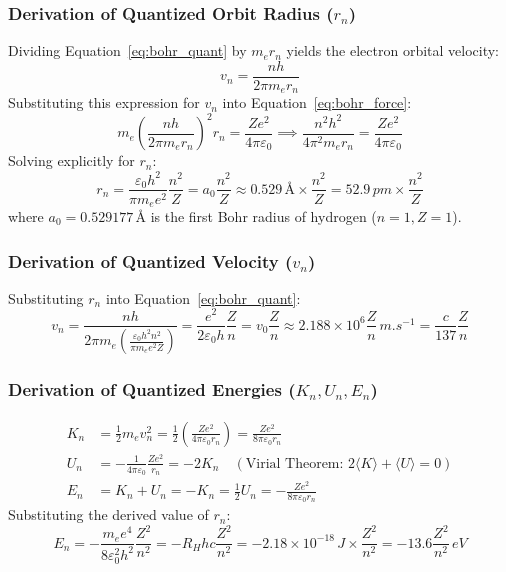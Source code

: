 \documentclass[10pt,a4paper]{article}
\begin{document}
\subsubsection{Derivation of Quantized Orbit Radius ($r_n$)}
Dividing Equation~\ref{eq:bohr_quant} by $m_e r_n$ yields the electron orbital velocity:
\begin{equation}
  v_n = \frac{n h}{2\pi m_e r_n}
\end{equation}
Substituting this expression for $v_n$ into Equation~\ref{eq:bohr_force}:
\begin{equation}
  m_e \left(\frac{n h}{2\pi m_e r_n}\right)^2 r_n = \frac{Z e^2}{4\pi\varepsilon_0} \implies \frac{n^2 h^2}{4\pi^2 m_e r_n} = \frac{Z e^2}{4\pi\varepsilon_0}
\end{equation}
Solving explicitly for $r_n$:
\begin{equation}
  r_n = \frac{\varepsilon_0 h^2}{\pi m_e e^2} \frac{n^2}{Z} = a_0 \frac{n^2}{Z} \approx 0.529\,\text{\AA} \times \frac{n^2}{Z} = 52.9\,\si{pm} \times \frac{n^2}{Z}
\end{equation}
where $a_0 = 0.529177\,\text{\AA}$ is the first Bohr radius of hydrogen ($n=1, Z=1$).

\subsubsection{Derivation of Quantized Velocity ($v_n$)}
Substituting $r_n$ into Equation~\ref{eq:bohr_quant}:
\begin{equation}
  v_n = \frac{n h}{2\pi m_e \left(\frac{\varepsilon_0 h^2 n^2}{\pi m_e e^2 Z}\right)} = \frac{e^2}{2\varepsilon_0 h}\frac{Z}{n} = v_0 \frac{Z}{n} \approx 2.188 \times 10^6 \frac{Z}{n}\,\si{m.s^{-1}} = \frac{c}{137}\frac{Z}{n}
\end{equation}

\subsubsection{Derivation of Quantized Energies ($K_n, U_n, E_n$)}
\begin{align}
  K_n &= \frac{1}{2}m_e v_n^2 = \frac{1}{2}\left(\frac{Z e^2}{4\pi\varepsilon_0 r_n}\right) = \frac{Z e^2}{8\pi\varepsilon_0 r_n} \\
  U_n &= -\frac{1}{4\pi\varepsilon_0}\frac{Z e^2}{r_n} = -2 K_n \quad (\text{Virial Theorem: } 2\langle K \rangle + \langle U \rangle = 0) \\
  E_n &= K_n + U_n = -K_n = \frac{1}{2}U_n = -\frac{Z e^2}{8\pi\varepsilon_0 r_n}
\end{align}
Substituting the derived value of $r_n$:
\begin{equation}
  E_n = -\frac{m_e e^4}{8\varepsilon_0^2 h^2}\frac{Z^2}{n^2} = -R_H h c \frac{Z^2}{n^2} = -2.18 \times 10^{-18}\,\si{J} \times \frac{Z^2}{n^2} = -13.6 \frac{Z^2}{n^2}\,\si{eV}
\end{equation}
\end{document}
